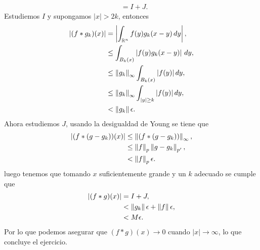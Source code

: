\begin{homeworkProblem}
\begin{solution}
\begin{enumerate}[(i)]
\begin{align*}
          &= I + J.
        \end{align*}
        Estudiemos $I$ y supongamos $|x|>2k$, entonces 
        \begin{align*}
          \left| (f*g_k)(x) \right|&=\left| \int_{\mathbb{R}^{n}}f(y)g_{k}(x-y)\, dy \right|,\\
          &\leq \int_{B_{k}(x)}\left| f(y)g_{k}(x-y) \right|\, dy,\\
          &\leq \left\|g_k\right\|_{\infty}\int_{B_{k}(x)}|f(y)|\, dy,\\
          &\leq \left\|g_k\right\|_{\infty}\int_{|y|\geq k}|f(y)|\, dy,\\
          &< \left\|g_k\right\|\epsilon.
        \end{align*}
        Ahora estudiemos $J$, usando la desigualdad de Young se tiene que
        \begin{align*}
          \left| (f*(g-g_k))(x) \right|&\leq \left\|(f*(g-g_k))\right\|_{\infty},\\
          &\leq \left\|f\right\|_{p}\left\|g-g_k\right\|_{p'},\\
          &< \left\|f\right\|_{p}\epsilon.
        \end{align*}
        luego tenemos que tomando $x$ suficientemente grande y un $k$ adecuado se cumple que 
        \begin{align*}
          \left| (f*g)(x) \right|&= I+J,\\
          &<\left\|g_k\right\|\epsilon + \left\|f\right\|\epsilon,\\
          &<M\epsilon.
        \end{align*}
        Por lo que podemos asegurar que $(f*g)(x)\to 0$ cuando $|x|\to \infty$, lo que concluye el ejercicio. 
    \end{enumerate}   
  \end{solution}
\end{homeworkProblem}
